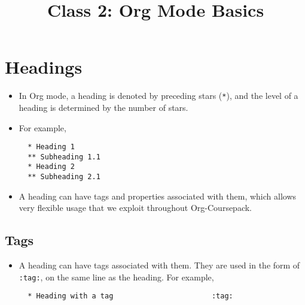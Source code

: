 \documentclass[10pt,article]{article}
\date{\vspace{-6ex}}
\title{Class 2: Org Mode Basics}
\begin{document}
\maketitle
{} 
\thispagestyle{fancy}

\setcounter{tocdepth}{1}
\tableofcontents
\vspace{6ex}

\section{Headings}
\label{sec:orgd916d22}
\begin{itemize}
\item In Org mode, a heading is denoted by preceding stars (\texttt{*}), and the level of
a heading is determined by the number of stars.
\item For example,

\begin{verbatim}
  * Heading 1
  ** Subheading 1.1
  * Heading 2
  ** Subheading 2.1
\end{verbatim}

\item A heading can have tags and properties associated with them, which allows
very flexible usage that we exploit throughout Org-Coursepack.
\end{itemize}
\subsection{Tags}
\label{sec:orgd79f8e8}
\begin{itemize}
\item A heading can have tags associated with them. They are used in the form of \texttt{:tag:}, on the same line as the heading. For example,

\begin{verbatim}
  * Heading with a tag                       :tag:
\end{verbatim}
\end{itemize}
\end{document}
